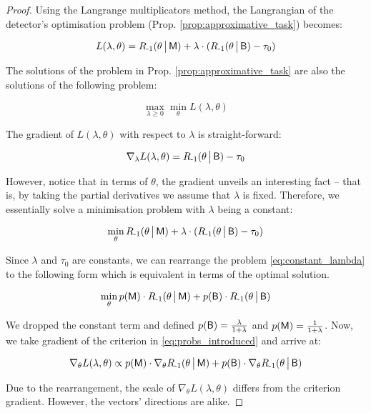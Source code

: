 \begin{proof}
    Using the Langrange multiplicators method, the Langrangian of the detector's optimisation problem (Prop. \ref{prop:approximative_task}) becomes:

    \begin{equation}
        L(\lambda, \theta) = R_{{\text{-}1}}(\theta \,\big|\, \mathsf{M}) + \lambda \cdot (R_{{\text{-}1}}(\theta \,\big|\, \mathsf{B}) - \tau_0)
    \end{equation}

    The solutions of the problem in Prop. \ref{prop:approximative_task} are also the solutions of the following problem:

    \begin{equation}
       \max_{\lambda \ge 0} \min_\theta L(\lambda, \theta)
   \end{equation}

    The gradient of $L(\lambda, \theta)$ with respect to $\lambda$ is straight-forward:

    \begin{equation}
        \nabla_\lambda L(\lambda, \theta) = R_{{\text{-}1}}(\theta \,\big|\, \mathsf{B}) - \tau_0
    \end{equation}

    However, notice that in terms of $\theta$, the gradient unveils an interesting fact – that is, by taking the partial derivatives we assume that $\lambda$ is fixed. Therefore, we essentially solve a minimisation problem with $\lambda$ being a constant:

    \begin{equation}\label{eq:constant_lambda}
       \min_\theta R_{{\text{-}1}}(\theta \,\big|\, \mathsf{M}) + \lambda \cdot (R_{{\text{-}1}}(\theta \,\big|\, \mathsf{B}) - \tau_0)
    \end{equation}

    Since $\lambda$ and $\tau_0$ are constants, we can rearrange the problem \eqref{eq:constant_lambda} to the following form which is equivalent in terms of the optimal solution.

    \begin{equation}\label{eq:probs_introduced}
       \min_\theta p(\mathsf{M}) \cdot R_{{\text{-}1}}(\theta \,\big|\, \mathsf{M}) + p(\mathsf{B}) \cdot R_{{\text{-}1}}(\theta \,\big|\, \mathsf{B})
    \end{equation}

    We dropped the constant term and defined $p(\mathsf{B}) = \frac{\lambda}{1 + \lambda}$ and $p(\mathsf{M}) = \frac{1}{1 + \lambda}$. Now, we take gradient of the criterion in \eqref{eq:probs_introduced} and arrive at:

    \begin{equation}\label{eq:langrangian_theta}
        \nabla_\theta L(\lambda, \theta) \propto p(\mathsf{M}) \cdot \nabla_\theta R_{{\text{-}1}}(\theta \,\big|\, \mathsf{M}) + p(\mathsf{B}) \cdot  \nabla_\theta R_{{\text{-}1}}(\theta \,\big|\, \mathsf{B})
    \end{equation}

    Due to the rearrangement, the scale of $\nabla_\theta L(\lambda, \theta)$ differs from the criterion gradient. However, the vectors' directions are alike.
\end{proof}

